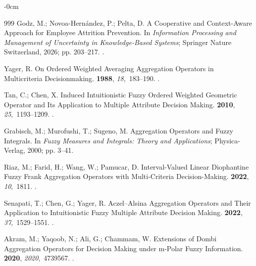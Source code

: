 \documentclass[mathematics,article,submit,moreauthors]{Definitions/mdpi}
\begin{document}
\begin{adjustwidth}{-\extralength}{0cm}
\begin{thebibliography}{999}
    Godz, M.; Novoa-Hernández, P.; Pelta, D.
    \newblock A Cooperative and Context-Aware Approach for Employee Attrition
    Prevention. In {\em Information Processing and Management of Uncertainty in
        Knowledge-Based Systems}; Springer Nature Switzerland,  2026; pp. 203--217.
    .
    
    Yager, R.
    \newblock On Ordered Weighted Averaging Aggregation Operators in Multicriteria
    Decisionmaking.
     {\bf 1988},
    {\em 18},~183--190.
    .
    
    Tan, C.; Chen, X.
    \newblock Induced Intuitionistic Fuzzy Ordered Weighted Geometric Operator and
    Its Application to Multiple Attribute Decision Making.
     {\bf 2010}, {\em
        25},~1193--1209.
    .
    
    Grabisch, M.; Murofushi, T.; Sugeno, M.
    \newblock Aggregation Operators and Fuzzy Integrals. In {\em Fuzzy Measures and
        Integrals: Theory and Applications}; Physica-Verlag,  2000; pp. 3--41.
    
    Riaz, M.; Farid, H.; Wang, W.; Pamucar, D.
    \newblock Interval-Valued Linear Diophantine Fuzzy Frank Aggregation Operators
    with Multi-Criteria Decision-Making.
     {\bf 2022}, {\em 10},~1811.
    .
    
    Senapati, T.; Chen, G.; Yager, R.
    \newblock Aczel--Alsina Aggregation Operators and Their Application to
    Intuitionistic Fuzzy Multiple Attribute Decision Making.
     {\bf 2022}, {\em
        37},~1529--1551.
    .
    
    Akram, M.; Yaqoob, N.; Ali, G.; Chammam, W.
    \newblock Extensions of Dombi Aggregation Operators for Decision Making under
    m-Polar Fuzzy Information.
     {\bf 2020}, {\em 2020},~4739567.
    .
    

\end{thebibliography}
\end{adjustwidth}
\end{document}
